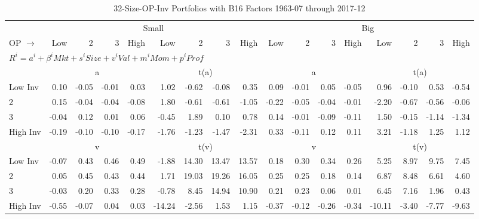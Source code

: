 
\begin{table}[!ht]
\footnotesize
\centering
\caption{32-Size-OP-Inv Portfolios with B16 Factors 1963-07 through 2017-12}
\begin{tabular}{lrrrrrrrrrrrrrrrr}
  \toprule
    & \multicolumn{8}{c}{Small} & \multicolumn{8}{c}{Big} \\
      \cmidrule(r){2-9} \cmidrule(r){10-17}
    OP $\rightarrow$ & Low & 2 & 3 & High & Low & 2 & 3 & High & Low & 2 & 3 & High & Low & 2 & 3 & High \\ 
  \midrule
  \multicolumn{17}{l}{$R^i=a^i+\beta^iMkt+s^iSize+v^iVal+m^iMom+p^iProf$} \\

  
    
      & \multicolumn{4}{c}{a} & \multicolumn{4}{c}{t(a)}
    
      & \multicolumn{4}{c}{a} & \multicolumn{4}{c}{t(a)}
    
    \\
      \cmidrule(r){2-5} \cmidrule(r){6-9} \cmidrule(r){10-13} \cmidrule(r){14-17}

    Low Inv   & 0.10  & -0.05  & -0.01  & 0.03  & 1.02  & -0.62  & -0.08  & 0.35  & 0.09  & -0.01  & 0.05  & -0.05  & 0.96  & -0.10  & 0.53  & -0.54  \\
           2  & 0.15  & -0.04  & -0.04  & -0.08  & 1.80  & -0.61  & -0.61  & -1.05  & -0.22  & -0.05  & -0.04  & -0.01  & -2.20  & -0.67  & -0.56  & -0.06  \\
           3  & -0.04  & 0.12  & 0.01  & 0.06  & -0.45  & 1.89  & 0.10  & 0.78  & 0.14  & -0.01  & -0.09  & -0.11  & 1.50  & -0.15  & -1.14  & -1.34  \\
    High Inv  & -0.19  & -0.10  & -0.10  & -0.17  & -1.76  & -1.23  & -1.47  & -2.31  & 0.33  & -0.11  & 0.12  & 0.11  & 3.21  & -1.18  & 1.25  & 1.12  \\

  
    
      & \multicolumn{4}{c}{v} & \multicolumn{4}{c}{t(v)}
    
      & \multicolumn{4}{c}{v} & \multicolumn{4}{c}{t(v)}
    
    \\
      \cmidrule(r){2-5} \cmidrule(r){6-9} \cmidrule(r){10-13} \cmidrule(r){14-17}

    Low Inv   & -0.07  & 0.43  & 0.46  & 0.49  & -1.88  & 14.30  & 13.47  & 13.57  & 0.18  & 0.30  & 0.34  & 0.26  & 5.25  & 8.97  & 9.75  & 7.45  \\
           2  & 0.05  & 0.45  & 0.43  & 0.44  & 1.71  & 19.03  & 19.26  & 16.05  & 0.25  & 0.25  & 0.18  & 0.14  & 6.87  & 8.48  & 6.61  & 4.60  \\
           3  & -0.03  & 0.20  & 0.33  & 0.28  & -0.78  & 8.45  & 14.94  & 10.90  & 0.21  & 0.23  & 0.06  & 0.01  & 6.45  & 7.16  & 1.96  & 0.43  \\
    High Inv  & -0.55  & -0.07  & 0.04  & 0.03  & -14.24  & -2.56  & 1.53  & 1.15  & -0.37  & -0.12  & -0.26  & -0.34  & -10.11  & -3.40  & -7.77  & -9.63  \\


\end{tabular}
\end{table}

